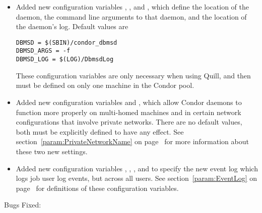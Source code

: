 \begin{itemize}
\item Added new configuration variables
, , and ,
which define the location of the  daemon,
the command line arguments to that daemon,
and the location of the daemon's log.
Default values are
\begin{verbatim}
DBMSD = $(SBIN)/condor_dbmsd
DBMSD_ARGS = -f
DBMSD_LOG = $(LOG)/DbmsdLog
\end{verbatim}
These configuration variables are only necessary when using Quill,
and then must be defined on only one machine in the Condor pool.

\item Added new configuration variables
 and
,
which allow Condor daemons to function more properly on multi-homed
machines and in certain network configurations that involve private
networks.
There are no default values, both must be explicitly defined to have
any effect.
See section~\ref{param:PrivateNetworkName} on
page~\pageref{param:PrivateNetworkName} for more information about
these two new settings.

\item Added new configuration variables
  , , , 
  and 
  to specify the new event log which logs job user log events,
  but across all users.
  See section~\ref{param:EventLog} on
  page~\pageref{param:EventLog} for definitions of these configuration
  variables.
\end{itemize}


\noindent Bugs Fixed:

